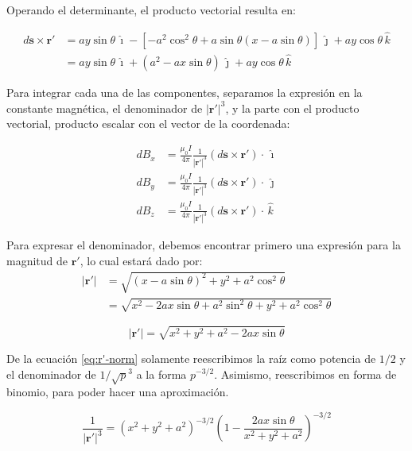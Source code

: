 \documentclass{article}
\def\ii{\, \hat{\imath}  }
\def\jj{\, \hat{\jmath}  }
\def\kk{\, \hat{k}}
\begin{document}
Operando el determinante, el producto vectorial resulta en:

\[
	\begin{aligned}
		d \mathbf{s} \times \mathbf{r}' & = ay \sin \theta \ii - [ -a^2 \cos^2 \theta + a \sin \theta (x-a\sin \theta) ] \jj + ay \cos \theta \kk \\
		                                & = ay \sin \theta \ii + (a^2 - ax \sin \theta) \jj + ay \cos \theta \kk
	\end{aligned}
\]

Para integrar cada una de las componentes, separamos la expresión en la constante magnética, el denominador de \( |\mathbf{r}'| ^3\), y la
parte con el producto vectorial, producto escalar con el vector de la coordenada:

\begin{align}
	d B_x & = \frac{\mu_0 I}{4 \pi}  \frac{1}{|\mathbf{r}'|^3} \left( d \mathbf{s} \times \mathbf{r}' \right) \cdot \ii \label{eq:Bx} \\
	d B_y & = \frac{\mu_0 I}{4 \pi}  \frac{1}{|\mathbf{r}'|^3} \left( d \mathbf{s} \times \mathbf{r}' \right) \cdot \jj \label{eq:By} \\
	d B_z & = \frac{\mu_0 I}{4 \pi}  \frac{1}{|\mathbf{r}'|^3} \left( d \mathbf{s} \times \mathbf{r}' \right) \cdot \kk \label{eq:Bz}
\end{align}

Para expresar el denominador, debemos encontrar primero una expresión para la magnitud de \(\mathbf{r}'\), lo cual estará dado por:
\[
	\begin{aligned}
		| \mathbf{r}' | & = \sqrt{ (x - a \sin \theta)^2 + y^2 + a^2 \cos^2 \theta }                        \\
		                & = \sqrt{ x^2 - 2 a x \sin \theta + a^2 \sin^2 \theta + y^2 + a^2 \cos ^2 \theta }
	\end{aligned}
\]

\begin{equation} \label{eq:r'-norm}
	| \mathbf{r}' | = \sqrt{ x^2 + y^2 + a^2 - 2 a x \sin \theta }
\end{equation}

De la ecuación \ref{eq:r'-norm} solamente reescribimos la raíz como potencia de \(1/2\) y el denominador de \(1/\sqrt{p}^3\) a la forma
\( p ^{-3/2} \). Asimismo, reescribimos en forma de binomio, para poder hacer una aproximación.

\begin{equation} \label{eq:denom}
	\frac{1}{| \mathbf{r}' |^3} = (x^2 + y^2 + a^2)^{-3/2} \left( 1 - \frac{2 a x \sin \theta}{x^2 + y^2 + a^2} \right)^{-3/2}
\end{equation}
\end{document}
